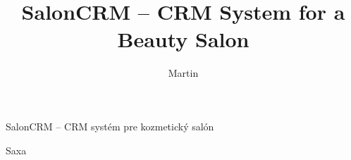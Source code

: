 

\title{SalonCRM -- CRM System for a Beauty Salon}{SalonCRM -- CRM systém pre kozmetický salón}

\author[Bc.]{Martin}{Saxa}
\newcommand{\projectauthors}{%
  Bc.~Martin Saxa \\
  Bc.~Jakub Spišák \\
  Bc.~Roman Šafranko \\
  Bc.~Samuel Šarkan%
}


\keywords{}{}
